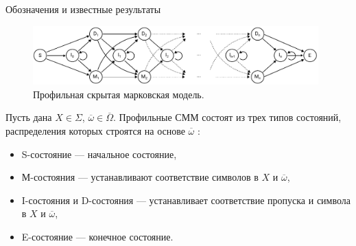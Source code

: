 \documentclass[ucs, notheorems, handout, 10pt]{beamer}
\begin{document}
	\begin{frame}{Обозначения и известные результаты}				
		\begin{figure}[h]
			\includegraphics[width=11cm]{../../report/figure2}
			\caption{Профильная скрытая марковская модель.}  \label{fg:3}
		\end{figure}	
		
		Пусть дана $X \in \Sigma$, $\overline{\omega} \in \overline{\Omega}$. Профильные СММ состоят из трех типов состояний, распределения которых строятся на основе $\overline{\omega}$ \cite{Compeau2015a}:
		\begin{itemize}
			\item S-состояние --- начальное состояние,
			\item М-состояния --- устанавливают соответствие символов в $X$ и $\overline{\omega}$,
			\item I-состояния и D-состояния --- устанавливает соответствие пропуска и символа в $X$ и $\overline{\omega}$,
			\item E-состояние --- конечное состояние.
		\end{itemize}
		
	\end{frame}
\end{document}
